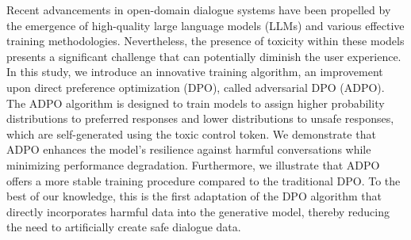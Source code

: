Recent advancements in open-domain dialogue systems have been propelled by the emergence of high-quality large language models (LLMs) and various effective training methodologies. Nevertheless, the presence of toxicity within these models presents a significant challenge that can potentially diminish the user experience. In this study, we introduce an innovative training algorithm, an improvement upon direct preference optimization (DPO), called adversarial DPO (ADPO). The ADPO algorithm is designed to train models to assign higher probability distributions to preferred responses and lower distributions to unsafe responses, which are self-generated using the toxic control token. We demonstrate that ADPO enhances the model's resilience against harmful conversations while minimizing performance degradation. Furthermore, we illustrate that ADPO offers a more stable training procedure compared to the traditional DPO. To the best of our knowledge, this is the first adaptation of the DPO algorithm that directly incorporates harmful data into the generative model, thereby reducing the need to artificially create safe dialogue data.